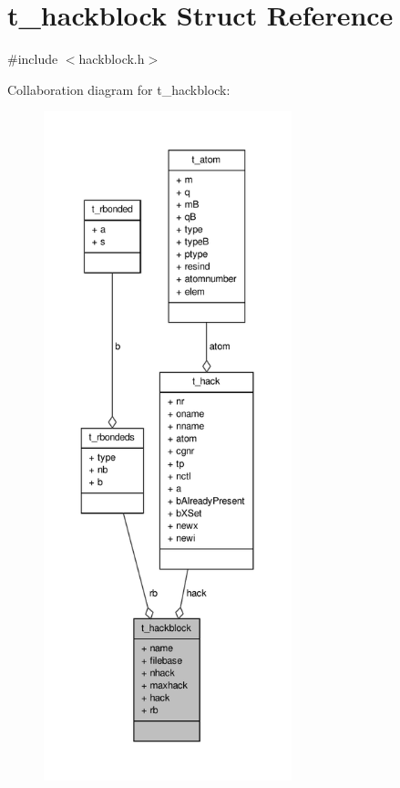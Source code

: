 \hypertarget{structt__hackblock}{\section{t\-\_\-hackblock \-Struct \-Reference}
\label{structt__hackblock}
}


{\ttfamily \#include $<$hackblock.\-h$>$}



\-Collaboration diagram for t\-\_\-hackblock\-:
\nopagebreak
\begin{figure}[H]
\begin{center}
\leavevmode
\includegraphics[height=550pt]{structt__hackblock__coll__graph}
\end{center}
\end{figure}
